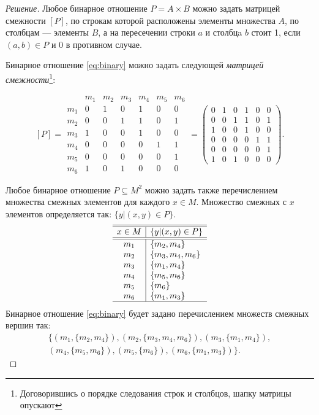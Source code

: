 \begin{proof}[Решение]
    Любое бинарное отношение $P=A\times B$ можно задать матрицей смежности $[P]$, по строкам которой расположены элементы множества $A$, по столбцам --- элементы $B$, а на пересечении строки $a$ и столбцa $b$ стоит 1, если $(a,b)\in P$ и 0 в противном случае. 

    Бинарное отношение \eqref{eq:binary} можно задать следующей \emph{матрицей смежности}\footnote{Договорившись о порядке следования строк и столбцов, шапку матрицы опускают}:

    \[
    [P]=
    \begin{array}{c|cccccc}
           &m_1&m_2&m_3&m_4&m_5&m_6\\ \hline
        m_1&0&1&0&1&0&0\\
        m_2&0&0&1&1&0&1\\
        m_3&1&0&0&1&0&0\\
        m_4&0&0&0&0&1&1\\
        m_5&0&0&0&0&0&1\\
        m_6&1&0&1&0&0&0
    \end{array}=
    \begin{pmatrix}
        0&1&0&1&0&0\\
        0&0&1&1&0&1\\
        1&0&0&1&0&0\\
        0&0&0&0&1&1\\
        0&0&0&0&0&1\\
        1&0&1&0&0&0
    \end{pmatrix}.
    \]

    Любое бинарное отношение $P\subseteq M^2$ можно задать также перечислением множества смежных элементов для каждого $x\in M$. Множество смежных с $x$ элементов определяется так: $\{y|(x,y)\in P\}$. 
    \[
        \begin{array}{c|l}
            \hline\hline
            x\in M&\{y|(x,y)\in P\}\\ \hline\hline
            m_1&\{m_2,m_4\}\\
            m_2&\{m_3,m_4,m_6\}\\
            m_3&\{m_1,m_4\}\\
            m_4&\{m_5,m_6\}\\
            m_5&\{m_6\}\\
            m_6&\{m_1,m_3\}\\ \hline
        \end{array}
    \]
    Бинарное отношение \eqref{eq:binary} будет задано перечислением множеств смежных вершин так:
    \[  
        \begin{split}
            \{
                (m_1,\{m_2,m_4\}), (m_2,\{m_3,m_4,m_6\}), (m_3,\{m_1,m_4\}),\\
                (m_4,\{m_5,m_6\}), (m_5,\{m_6\}),       (m_6,\{m_1,m_3\})\}.
        \end{split}
    \]
\end{proof}

